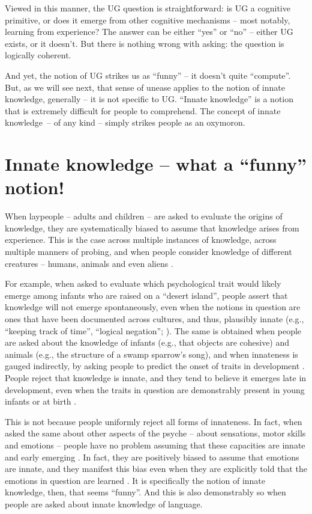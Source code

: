 \documentclass[output=paper,colorlinks,citecolor=brown
]{langscibook}
\begin{document}
Viewed in this manner, the UG question is straightforward: is UG a cognitive primitive, or does it emerge from other cognitive mechanisms -- most notably, learning from experience?
The answer can be either ``yes'' or ``no'' -- either UG exists, or it doesn’t. But there is nothing wrong with asking: the question is logically coherent. 

And yet, the notion of UG strikes us as ``funny'' -- it doesn’t quite ``compute''. But, as we will see next, that sense of unease applies to the notion of innate knowledge, generally -- it is not specific to UG. ``Innate knowledge'' is a notion that is extremely difficult for people to comprehend. The concept of innate knowledge~-- of any kind -- simply strikes people as an oxymoron.

\section{Innate knowledge -- what a ``funny'' notion!}

When laypeople -- adults and children -- are asked to evaluate the origins of knowledge, they are systematically biased to assume that knowledge arises from experience. This is the case across multiple instances of knowledge, across multiple manners of probing, and when people consider knowledge of different creatures -- humans, animals and even aliens \citep{berent2019people,wang2019empiricism}.

For example, when asked to evaluate which psychological trait would likely emerge among infants who are raised on a ``desert island'', people assert that knowledge will not emerge spontaneously, even when the notions in question are ones that have been documented across cultures, and thus, plausibly innate (e.g., ``keeping track of time'', ``logical negation''; \cite{berent2019people}). The same is obtained when people are asked about the knowledge of infants (e.g., that objects are cohesive) and animals (e.g., the structure of a swamp sparrow’s song), and when innateness is gauged indirectly, by asking people to predict the onset of traits in development \citep{berent2019people}. People reject that knowledge is innate, and they tend to believe it emerges late in development, even when the traits in question are demonstrably present in young infants or at birth \citep{wang2019empiricism}.

This is not because people uniformly reject all forms of innateness. In fact, when asked the same about other aspects of the psyche -- about sensations, motor skills and emotions -- people have no problem assuming that these capacities are innate and early emerging \citep{berent2019people}. In fact, they are positively biased to assume that emotions are innate, and they manifest this bias even when they are explicitly told that the emotions in question are learned \citep{berent2020essentialist}. It is specifically the notion of innate knowledge, then, that seems ``funny''. And this is also demonstrably so when people are asked about innate knowledge of language.
\end{document}
